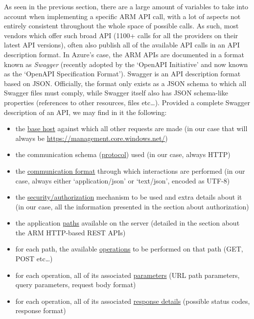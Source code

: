 \documentclass[11pt]{report}
\begin{document}
As seen in the previous section, there are a large amount of variables to take
into account when implementing a specific ARM API call, with a lot of aspects
not entirely consistent throughout the whole space of possible calls. As
such, most vendors which offer such broad API (1100+ calls for all the
providers on their latest API versions), often also publish all of the
available API calls in an API description format. In Azure's case, the ARM APIs
are documented \cite{azureApiSpecs} in a format known as \textit{Swagger}
(recently adopted by the `OpenAPI Initiative' \cite{openApiInitiative} and
now known as the  `OpenAPI Specification Format').
Swagger is an API description format based on JSON\@. Officially, the format only
exists as a JSON schema \cite{swaggerSpecification} to which all Swagger files
must comply, while Swagger itself also has JSON schema-like properties (references
to other resources, files etc\ldots). Provided a complete Swagger description
of an API, we may find in it the following:

\begin{itemize}
    \item{} the \ul{base host} against which all other requests are made (in our
        case that will always be \url{https://management.core.windows.net/})
    \item{} the communication schema (\ul{protocol}) used (in our case,
        always HTTP)
    \item{} the \ul{communication format} through which interactions are
        performed (in our case, always either `application/json' or
        `text/json', encoded as UTF-8)
    \item{} the \ul{security/authorization} mechanism to be used and extra details
        about it (in our case, all the information presented in the section
        about authorization)
    \item{} the application \ul{paths} available on the server (detailed in the
        section about the ARM HTTP-based REST APIs)
    \item{} for each path, the available \ul{operations} to be performed on
        that path (GET, POST etc\ldots)
    \item{} for each operation, all of its associated \ul{parameters} (URL path
        parameters, query parameters, request body format)
    \item{} for each operation, all of its associated \ul{response details}
        (possible status codes, response format)
\end{itemize}
\end{document}
